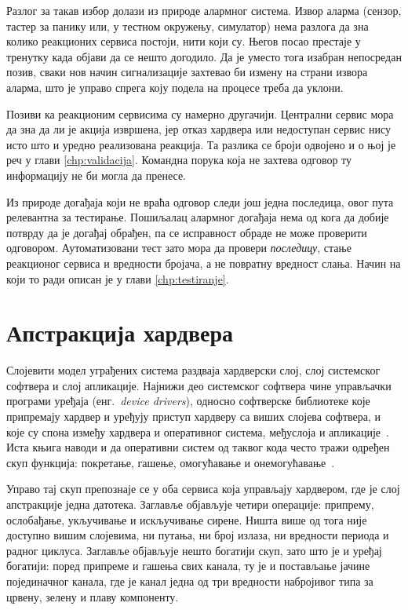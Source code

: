 \documentclass[12pt,oneside]{memoir}
\begin{document}
Разлог за такав избор долази из природе алармног система. Извор аларма (сензор, тастер за
панику или, у тестном окружењу, симулатор) нема разлога да зна колико реакционих сервиса
постоји, нити који су. Његов посао престаје у тренутку када објави да се нешто догодило. Да
је уместо тога изабран непосредан позив, сваки нов начин сигнализације захтевао би измену
на страни извора аларма, што је управо спрега коју подела на процесе треба да уклони.

Позиви ка реакционим сервисима су намерно другачији. Централни сервис мора да зна да ли је
акција извршена, јер отказ хардвера или недоступан сервис нису исто што и уредно
реализована реакција. Та разлика се броји одвојено и о њој је реч у глави
\ref{chp:validacija}. Командна порука која не захтева одговор ту информацију не би могла да
пренесе.

Из природе догађаја који не враћа одговор следи још једна последица, овог пута релевантна за тестирање.
Пошиљалац алармног догађаја нема од кога да добије потврду да је догађај обрађен, па се
исправност обраде не може проверити одговором. Аутоматизовани тест зато мора да провери
\emph{последицу}, стање реакционог сервиса и вредности бројача, а не повратну вредност
слања. Начин на који то ради описан је у глави \ref{chp:testiranje}.

\section{Апстракција хардвера}
\label{sec:hal}

Слојевити модел уграђених система раздваја хардверски слој, слој системског софтвера и слој
апликације. Најнижи део системског софтвера чине управљачки програми уређаја
(енг.\ \textit{device drivers}), односно софтверске библиотеке које припремају хардвер и уређују
приступ хардверу са виших слојева софтвера, и које су спона између хардвера и оперативног
система, међуслоја и апликације~\cite{Noergaard2005}. Иста књига наводи и да
оперативни систем од таквог кода често тражи одређен скуп функција: покретање, гашење,
омогућавање и онемогућавање~\cite{Noergaard2005}.

Управо тај скуп препознаје се у оба сервиса која управљају хардвером, где је слој
апстракције једна датотека. Заглавље  објављује четири операције: припрему, ослобађање,
укључивање и искључивање сирене. Ништа више од тога није доступно вишим слојевима, ни
путања, ни број излаза, ни вредности периода и радног циклуса.
Заглавље  објављује нешто богатији скуп, зато што је и уређај богатији:
поред припреме и гашења свих канала, ту је и постављање јачине појединачног канала, где је
канал једна од три вредности набројивог типа за црвену, зелену и плаву компоненту.
\end{document}
